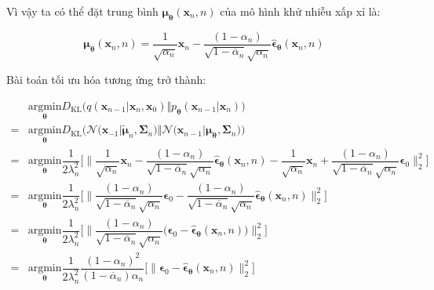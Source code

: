 \documentclass[14pt, a4paper]{article}
\numberwithin{equation}{section}
\numberwithin{figure}{section}
\numberwithin{dl}{section}
\numberwithin{md}{section}
\numberwithin{bd}{section}
\numberwithin{dn}{section}
\numberwithin{hq}{section}
\begin{document}
    Vì vậy ta có thể đặt trung bình $\boldsymbol{\mu}_{\boldsymbol{\theta}} (\boldsymbol{x}_n, n)$ của mô hình khử nhiễu xấp xỉ là:

    \begin{equation}
        \boldsymbol{\mu}_{\boldsymbol{\theta}} (\boldsymbol{x}_n, n) = \dfrac{1}{\sqrt{\alpha_n}} \boldsymbol{x}_n - \dfrac{(1 - \alpha_n)}{\sqrt{1 - \overline{\alpha}_n}\sqrt{\alpha_n}} \hat{\boldsymbol{\epsilon}}_{\boldsymbol{\theta}} (\boldsymbol{x}_n, n)
    \end{equation}

    Bài toán tối ưu hóa tương ứng trở thành:

    \begin{equation}
        \begin{aligned}
            &\underset{\boldsymbol{\theta}}{\mathrm{argmin}} D_{\mathrm{KL}} \Big( q(\boldsymbol{x}_{n-1} \vert \boldsymbol{x}_n, \boldsymbol{x}_0) \Vert p_{\boldsymbol{\theta}} (\boldsymbol{x}_{n-1} \vert \boldsymbol{x}_n) \Big) \\
            = &\underset{\boldsymbol{\theta}}{\mathrm{argmin}} D_{\mathrm{KL}} \Big( \mathcal{N} \big( \boldsymbol{x}_{-1} \vert \tilde{\boldsymbol{\mu}}_{n}, \boldsymbol{\Sigma}_n \big) \Vert \mathcal{N} \big( \boldsymbol{x}_{n-1} \vert \boldsymbol{\mu}_{\boldsymbol{\theta}}, \boldsymbol{\Sigma}_n \big) \Big) \\
            = &\underset{\boldsymbol{\theta}}{\mathrm{argmin}} \dfrac{1}{2\lambda_n^2} \Bigg \lbrack \Bigg \lVert \dfrac{1}{\sqrt{\alpha_n}} \boldsymbol{x}_n - \dfrac{(1 - \alpha_n)}{\sqrt{1 - \overline{\alpha}_n}\sqrt{\alpha_n}} \hat{\boldsymbol{\epsilon}}_{\boldsymbol{\theta}} (\boldsymbol{x}_n, n) - \dfrac{1}{\sqrt{\alpha_n}} \boldsymbol{x}_n + \dfrac{(1 - \alpha_n)}{\sqrt{1 - \overline{\alpha}_n}\sqrt{\alpha_n}} \boldsymbol{\epsilon}_0 \Bigg \rVert_2^2 \Bigg \rbrack \\
            = &\underset{\boldsymbol{\theta}}{\mathrm{argmin}} \dfrac{1}{2\lambda_n^2} \Bigg \lbrack \Bigg \lVert \dfrac{(1 - \alpha_n)}{\sqrt{1 - \overline{\alpha}_n}\sqrt{\alpha_n}} \boldsymbol{\epsilon}_0 - \dfrac{(1 - \alpha_n)}{\sqrt{1 - \overline{\alpha}_n}\sqrt{\alpha_n}} \hat{\boldsymbol{\epsilon}}_{\boldsymbol{\theta}} (\boldsymbol{x}_n, n) \Bigg \rVert_2^2 \Bigg \rbrack \\
            = &\underset{\boldsymbol{\theta}}{\mathrm{argmin}} \dfrac{1}{2\lambda_n^2} \Bigg \lbrack \Bigg \lVert \dfrac{(1 - \alpha_n)}{\sqrt{1 - \overline{\alpha}_n}\sqrt{\alpha_n}} \big( \boldsymbol{\epsilon}_0 - \hat{\boldsymbol{\epsilon}}_{\boldsymbol{\theta}} (\boldsymbol{x}_n, n) \big) \Bigg \rVert_2^2 \Bigg \rbrack \\
            = &\underset{\boldsymbol{\theta}}{\mathrm{argmin}} \dfrac{1}{2\lambda_n^2} \dfrac{(1 - \alpha_n)^2}{(1 - \overline{\alpha}_n)\alpha_n} \big \lbrack \big \lVert \boldsymbol{\epsilon}_0 - \hat{\boldsymbol{\epsilon}}_{\boldsymbol{\theta}} (\boldsymbol{x}_n, n) \big \rVert_2^2 \big \rbrack \\
        \end{aligned}
    \end{equation}
\end{document}
